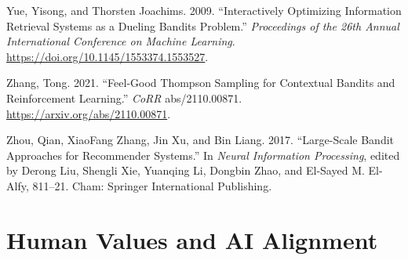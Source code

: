 \documentclass[
  letterpaper,
  numbers=noenddot,
  DIV=11,
  oneside]{scrreprt}
\newlength{\cslhangindent}
\newenvironment{CSLReferences}[2] %
 {\begin{list}{}{%
  \setlength{\itemindent}{0pt}
  \setlength{\leftmargin}{0pt}
  \setlength{\parsep}{0pt}
  \ifodd #1
   \setlength{\leftmargin}{\cslhangindent}
   \setlength{\itemindent}{-1\cslhangindent}
  \fi
  \setlength{\itemsep}{#2\baselineskip}}}
 {\end{list}}
\let\oldchapter\chapter
\def\chapter{%
  \setcounter{sidenote}{1}%
  \oldchapter
}
\theoremstyle{remark}
\begin{document}
\begin{CSLReferences}{1}{0}
Yue, Yisong, and Thorsten Joachims. 2009. {``Interactively Optimizing
Information Retrieval Systems as a Dueling Bandits Problem.''}
\emph{Proceedings of the 26th Annual International Conference on Machine
Learning}. \url{https://doi.org/10.1145/1553374.1553527}.

Zhang, Tong. 2021. {``Feel-Good Thompson Sampling for Contextual Bandits
and Reinforcement Learning.''} \emph{CoRR} abs/2110.00871.
\url{https://arxiv.org/abs/2110.00871}.

Zhou, Qian, XiaoFang Zhang, Jin Xu, and Bin Liang. 2017. {``Large-Scale
Bandit Approaches for Recommender Systems.''} In \emph{Neural
Information Processing}, edited by Derong Liu, Shengli Xie, Yuanqing Li,
Dongbin Zhao, and El-Sayed M. El-Alfy, 811--21. Cham: Springer
International Publishing.

\end{CSLReferences}


\chapter{Human Values and AI Alignment}\label{sec-human-ai-alginment}
\end{document}

